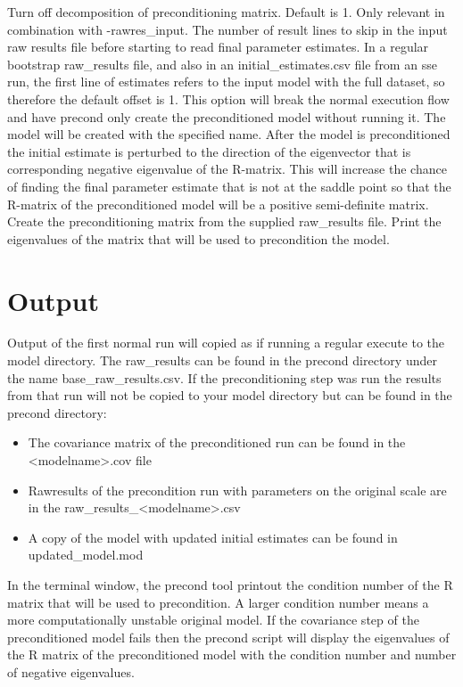 \begin{optionlist}
\nextopt
{}
Turn off decomposition of preconditioning matrix.
\nextopt
{}
Default is 1. Only relevant in combination with -rawres\_input. The number of result lines to skip in the input raw results file before starting to read final parameter estimates. In a regular bootstrap raw\_results file, and also in an initial\_estimates.csv file from an sse run, the first line of estimates refers to the input model with the full dataset, so therefore the default offset is 1.
\nextopt
{}
This option will break the normal execution flow and have precond only create the preconditioned model without running it.
The model will be created with the specified name.
\nextopt
{}
After the model is preconditioned the initial estimate is perturbed to the direction of the eigenvector that is corresponding negative eigenvalue of the R-matrix.  This will increase the chance of finding the final parameter estimate that is not at the saddle point so that the R-matrix of the preconditioned model will be a positive semi-definite matrix.
\nextopt
{}
Create the preconditioning matrix from the supplied raw\_results file.
\nextopt
{}
Print the eigenvalues of the matrix that will be used to precondition the model.
\nextopt
\end{optionlist}

\section{Output}
Output of the first normal run will copied as if running a regular execute to the model directory. The raw\_results can be found in the precond directory under the name base\_raw\_results.csv. If the preconditioning step was run the results from that run will not be copied to your model directory but can be found in the precond directory:
\begin{itemize}
    \item The covariance matrix of the preconditioned run can be found in the <modelname>.cov file
    \item Rawresults of the precondition run with parameters on the original scale are in the raw\_results\_<modelname>.csv
    \item A copy of the model with updated initial estimates can be found in updated\_model.mod
\end{itemize}
In the terminal window, the precond tool printout the condition number of the R matrix that will be used to precondition.  A larger condition number means a more computationally unstable original model. If the covariance step of the preconditioned model fails then the precond script will display the eigenvalues of the R matrix of the preconditioned model with the condition number and number of negative eigenvalues.  

